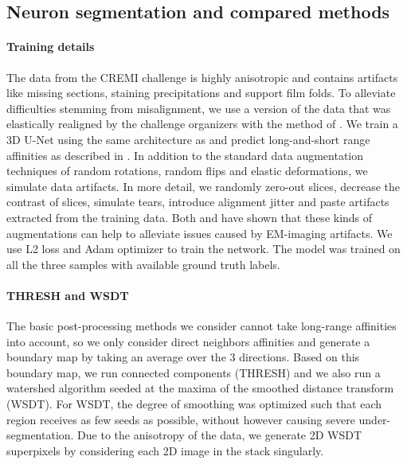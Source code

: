 \subsection{Neuron segmentation and compared methods}\label{sec:cremi_details}
\paragraph{Training details} The data from the CREMI challenge is highly anisotropic and contains artifacts like missing sections, staining precipitations and support film folds. 
To alleviate difficulties stemming from misalignment, we use a version of the data that was elastically realigned by the challenge organizers with the method of \cite{saalfeld2012elastic}.
We train a 3D U-Net \cite{ronneberger2015u,cciccek20163d} using the same architecture as \cite{funke2018large} and predict long-and-short range affinities 
as described in \cite{lee2017superhuman}. In addition to the standard data augmentation techniques of random rotations, random flips and  elastic deformations, we simulate data artifacts.
In more detail, we randomly zero-out slices, decrease the contrast of slices, simulate tears, introduce alignment jitter and paste artifacts extracted from the training data. Both \cite{funke2018large} and \cite{lee2017superhuman} have shown
that these kinds of augmentations can help to alleviate issues caused by EM-imaging artifacts.
We use L2 loss and Adam optimizer to train the network. The model was trained on all the three samples with available ground truth labels.  

\paragraph{THRESH and WSDT} The basic post-processing methods we consider cannot take long-range affinities into account, so we only consider direct neighbors affinities and generate a boundary map by taking an average over the 3 directions. Based on this boundary map, we run connected components (THRESH) and we also run a watershed algorithm  seeded at the maxima of the smoothed distance transform (WSDT). For WSDT, the degree of smoothing was optimized such that each region receives as few seeds as possible, without however causing severe under-segmentation. Due to the anisotropy of the data, we generate 2D WSDT superpixels by considering each 2D image in the stack singularly.



